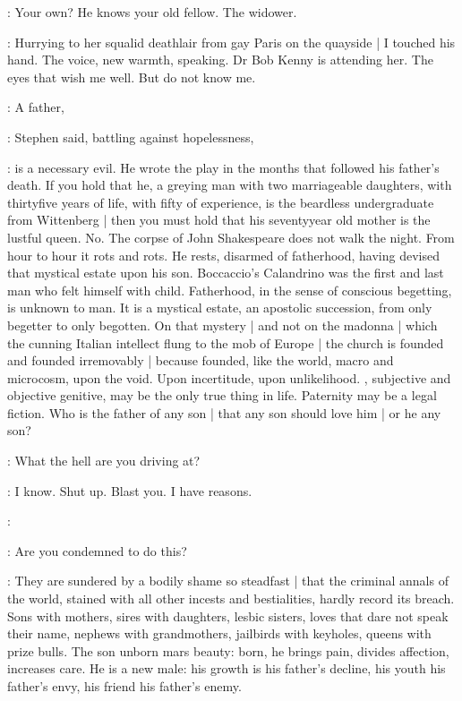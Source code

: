 \StephenInt:
Your own?
He knows your old fellow.
The widower.

\StephenInt:
Hurrying to her squalid deathlair from gay Paris on the quayside |
I touched his hand.
The voice, new warmth, speaking.
Dr Bob Kenny is attending her.
The eyes that wish me well.
But do not know me.

\Stephen:
A father,

:
Stephen said, battling against hopelessness,

\Stephen:
is a necessary evil.
He wrote the play in the months that followed his father's death.
If you hold that he,
a greying man with two marriageable daughters,
with thirtyfive years of life,
with fifty of experience,
is the beardless undergraduate from Wittenberg |
then you must hold that his seventyyear old mother is the lustful queen.
No.
The corpse of John Shakespeare does not walk the night.
From hour to hour it rots and rots.
He rests,
disarmed of fatherhood,
having devised that mystical estate upon his son.
Boccaccio's Calandrino was the first and last man who felt himself with child.
Fatherhood, in the sense of conscious begetting,
is unknown to man.
It is a mystical estate,
an apostolic succession,
from only begetter to only begotten.
On that mystery |
and not on the madonna |
which the cunning Italian intellect flung to the mob of Europe |
the church is founded and founded irremovably |
because founded,
like the world,
macro and microcosm,
upon the void.
Upon incertitude,
upon unlikelihood.
,
subjective and objective genitive,
may be the only true thing in life.
Paternity may be a legal fiction.
Who is the father of any son |
that any son should love him |
or he any son?

\StephenInt:
What the hell are you driving at?

\StephenInt:
I know.
Shut up.
Blast you.
I have reasons.

\StephenInt:

\StephenInt:
Are you condemned to do this?

\Stephen:
They are sundered by a bodily shame so steadfast |
that the criminal annals of the world,
stained with all other incests and bestialities,
hardly record its breach.
Sons with mothers,
sires with daughters,
lesbic sisters,
loves that dare not speak their name,
nephews with grandmothers,
jailbirds with keyholes,
queens with prize bulls.
The son unborn mars beauty:
born,
he brings pain,
divides affection,
increases care.
He is a new male:
his growth is his father's decline,
his youth his father's envy,
his friend his father's enemy.

